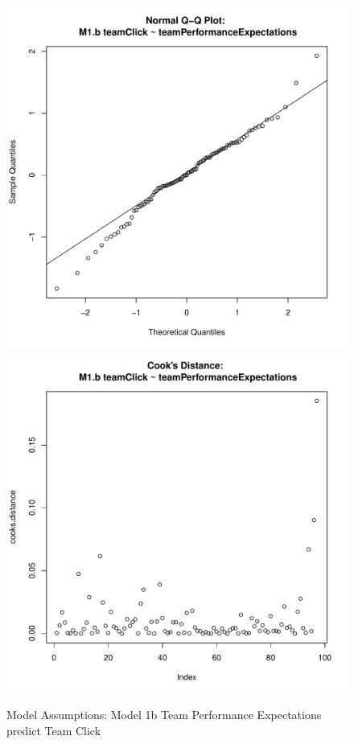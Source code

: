 {\begin{figure}[htbp]
  \includegraphics[scale =.4]{images/MLM1bQQNorm.pdf}
  \includegraphics[scale =.4]{images/MLM1bCooksD.pdf}
  \caption{Model Assumptions: Model 1b Team Performance Expectations predict Team Click}
  \label{fig:MLM1bAssumptions}
\end{figure}




}
